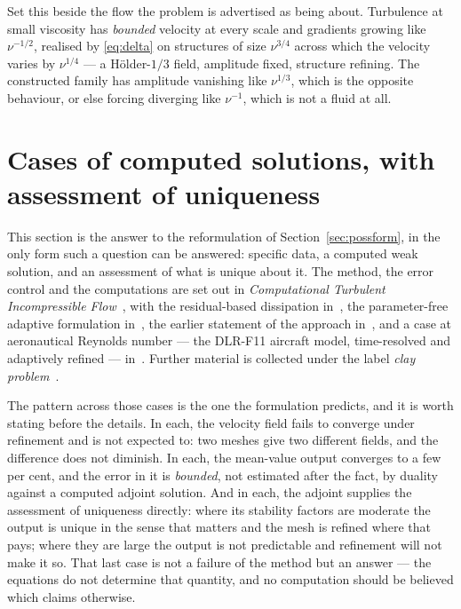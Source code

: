 \documentclass[11pt]{article}
\begin{document}
Set this beside the flow the problem is advertised as being about. Turbulence at small viscosity has
\emph{bounded} velocity at every scale and gradients growing like $\nu^{-1/2}$, realised by
\eqref{eq:delta} on structures of size $\nu^{3/4}$ across which the velocity varies by $\nu^{1/4}$
--- a H\"older-$1/3$ field, amplitude fixed, structure refining. The constructed family has amplitude
vanishing like $\nu^{1/3}$, which is the opposite behaviour, or else forcing diverging like
$\nu^{-1}$, which is not a fluid at all.


\section{Cases of computed solutions, with assessment of uniqueness}

This section is the answer to the reformulation of Section~\ref{sec:possform}, in the only form such
a question can be answered: specific data, a computed weak solution, and an assessment of what is
unique about it. The method, the error control and the computations are set out in
\emph{Computational Turbulent Incompressible Flow}~\cite{cfd}, with the residual-based dissipation
in~\cite{hjv}, the parameter-free adaptive formulation in~\cite{hjja}, the earlier statement of the
approach in~\cite{newapproach}, and a case at aeronautical Reynolds number --- the DLR-F11 aircraft
model, time-resolved and adaptively refined --- in~\cite{dlrf11}. Further material is collected under
the label \emph{clay problem}~\cite{blog}.

The pattern across those cases is the one the formulation predicts, and it is worth stating before
the details. In each, the velocity field fails to converge under refinement and is not expected to:
two meshes give two different fields, and the difference does not diminish. In each, the mean-value
output converges to a few per cent, and the error in it is \emph{bounded}, not estimated after the
fact, by duality against a computed adjoint solution. And in each, the adjoint supplies the
assessment of uniqueness directly: where its stability factors are moderate the output is unique in
the sense that matters and the mesh is refined where that pays; where they are large the output is
not predictable and refinement will not make it so. That last case is not a failure of the method
but an answer --- the equations do not determine that quantity, and no computation should be
believed which claims otherwise.
\end{document}
